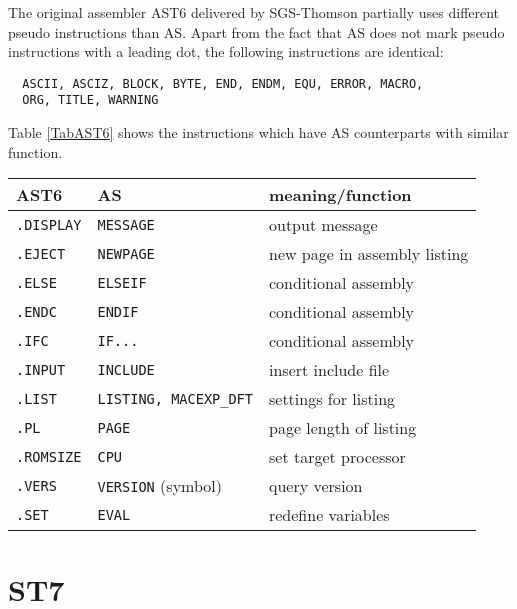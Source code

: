 \documentclass[12pt,twoside]{report}
\newcommand{\tty}[1]{{\tt #1}}
\begin{document}
The original assembler AST6 delivered by SGS-Thomson partially uses
different pseudo instructions than AS.  Apart from the fact that AS
does not mark pseudo instructions with a leading dot, the following
instructions are identical:
\begin{verbatim}
  ASCII, ASCIZ, BLOCK, BYTE, END, ENDM, EQU, ERROR, MACRO,
  ORG, TITLE, WARNING
\end{verbatim}
Table \ref{TabAST6} shows the instructions which have AS counterparts
with similar function.
\par
\begin{table*}[htbp]
\begin{center}\begin{tabular}{|l|l|l|}
\hline
AST6            & AS                     & meaning/function \\
\hline
\hline
\tty{.DISPLAY}  & \tty{MESSAGE}          & output message \\
\hline
\tty{.EJECT}    & \tty{NEWPAGE}          & new page in assembly listing \\
\hline
\tty{.ELSE}     & \tty{ELSEIF}           & conditional assembly \\
\hline
\tty{.ENDC}     & \tty{ENDIF}            & conditional assembly \\
\hline
\tty{.IFC}      & \tty{IF...}            & conditional assembly \\
\hline
\tty{.INPUT}    & \tty{INCLUDE}          & insert include file \\
\hline
\tty{.LIST}     & \tty{LISTING, MACEXP\_DFT}  & settings for listing \\
\hline
\tty{.PL}       & \tty{PAGE}             & page length of listing \\
\hline
\tty{.ROMSIZE}  & \tty{CPU}              & set target processor \\
\hline
\tty{.VERS}     & \tty{VERSION} (symbol) & query version \\
\hline
\tty{.SET}      & \tty{EVAL}             & redefine variables \\
\hline
\end{tabular}\end{center}
\caption{Equivalent Instructions AST6$\leftrightarrow$AS\label{TabAST6}}
\end{table*}


\section{ST7}
\end{document}
